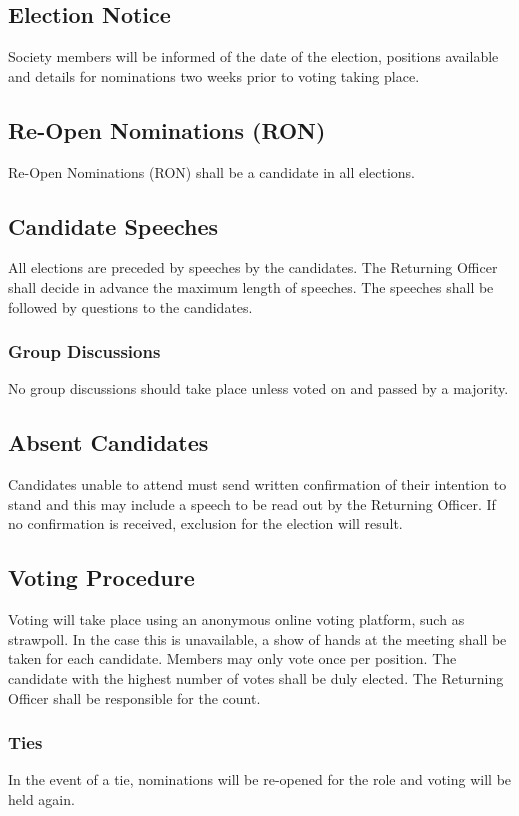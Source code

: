 \documentclass[11pt,a4paper]{article}
\begin{document}
\subsection{Election Notice}
Society members will be informed of the date of the election, positions available and details for nominations two weeks prior to voting taking place.

\subsection{Re-Open Nominations (RON)}
Re-Open Nominations (RON) shall be a candidate in all elections.

\subsection{Candidate Speeches}
All elections are preceded by speeches by the candidates. The Returning Officer shall decide in advance the maximum length of speeches. The speeches shall be followed by questions to the candidates.

\subsubsection{Group Discussions}
No group discussions should take place unless voted on and passed by a majority.

\subsection{Absent Candidates}
Candidates unable to attend must send written confirmation of their intention to stand and this may include a speech to be read out by the Returning Officer. If no confirmation is received, exclusion for the election will result.

\subsection{Voting Procedure}
Voting will take place using an anonymous online voting platform, such as strawpoll. In the case this is unavailable, a show of hands at the meeting shall be taken for each candidate. Members may only vote once per position. The candidate with the highest number of votes shall be duly elected. The Returning Officer shall be responsible for the count.

\subsubsection{Ties}
In the event of a tie, nominations will be re-opened for the role and voting will be held again.
\end{document}

